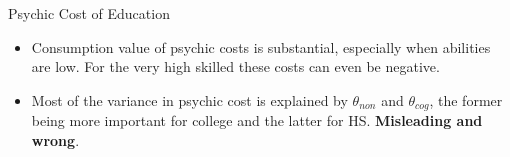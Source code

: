 \documentclass{beamer}
\begin{document}
\begin{frame}[label=Psychic Costs]{Psychic Cost of Education}
\begin{itemize}
\item Consumption value of psychic costs is substantial, especially when abilities are low. For the very high skilled these costs can even be negative.

\item Most of the variance in psychic cost is explained by $\theta_{non}$ and $\theta_{cog}$, the former being more important for college and the latter for HS. \textbf{Misleading and wrong}. %


\end{itemize}
\end{frame}


\end{document}
